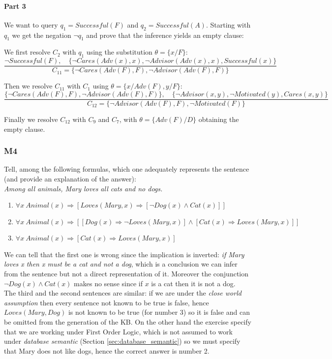 \documentclass[10pt,a4paper]{article}
\begin{document}
\paragraph{Part 3}
We want to query $q_1=Successful(F)$ and $q_2=Successful(A)$. Starting with $q_1$ we get the negation $\neg q_1$ and prove that the inference yields an empty clause:

We first resolve $C_2$ with $q_1$ using the substitution $\theta=\{x/F\}$:
\[\frac{\neg Successful(F),\quad \lbrace  \neg Cares(Adv(x),x), \neg Advisor(Adv(x),x), Successful(x)\rbrace}{C_{11}=\lbrace  \neg Cares(Adv(F),F), \neg Advisor(Adv(F),F)\rbrace}\]

Then we resolve $C_{11}$ with $C_1$ using $\theta=\{x/Adv(F),y/F\}$:
\[\frac{\lbrace  \neg Cares(Adv(F),F), \neg Advisor(Adv(F),F)\rbrace,\quad \lbrace \neg Advisor(x,y), \neg Motivated(y), Cares(x,y)\rbrace}{C_{12}=\lbrace \neg Advisor(Adv(F),F),\neg Motivated(F) \rbrace}\]

Finally we resolve $C_{12}$ with $C_9$ and $C_7$, with $\theta=\{Adv(F)/D\}$ obtaining the empty clause.

\subsubsection{M4}
Tell, among the following formulas, which one adequately represents the sentence (and provide an explanation of the answer):\\
\textit{Among all animals, Mary loves all cats and no dogs.}\\
\begin{enumerate}
\item $\forall x\ Animal(x)\Rightarrow[Loves(Mary,x)\Rightarrow[\neg Dog(x)\wedge Cat(x)]]$
\item $\forall x\ Animal(x)\Rightarrow[[Dog(x)\Rightarrow \neg Loves(Mary,x)]\wedge [ Cat(x)\Rightarrow Loves(Mary,x)]]$
\item $\forall x\ Animal(x)\Rightarrow[Cat(x)\Rightarrow Loves(Mary,x)]$
\end{enumerate}

We can tell that the first one is wrong since the implication is inverted: \textit{if Mary loves x then x must be a cat and not a dog}, which is a conclusion we can infer from the sentence but not a direct representation of it. Moreover the conjunction $\neg Dog(x)\wedge Cat(x)$ makes no sense since if $x$ is a cat then it is not a dog.\\

The third and the second sentences are similar: if we are under the \textit{close world assumption} then every sentence not known to be true is false, hence $Loves(Mary,Dog)$ is not known to be true (for number 3) so it is false and can be omitted from the generation of the KB. On the other hand the exercise specify that we are working under First Order Logic, which is not assumed to work under \textit{database semantic} (Section \ref{sec:database_semantic}) so we must specify that Mary does not like dogs, hence the correct answer is number 2.
\end{document}
